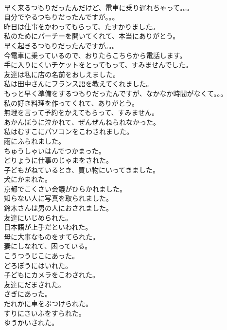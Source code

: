 \documentclass[8pt]{extreport}
\begin{document}
\begin{CJK}{UTF8}{min}
\\	早く来るつもりだったんだけど、電車に乗り遅れちゃって。。。
\\	自分でやるつもりだったんですが。。。
\\	昨日は仕事をかわってもらって、たすかりました。
\\	私のためにパーチーを開いてくれて、本当にありがとう。
\\	早く起きるつもりだったんですが。。。
\\	今電車に乗っているので、おりたらこちらから電話します。
\\	手に入りにくいチケットをとってもって、すみませんでした。
\\	友達は私に店の名前をおしえました。
\\	私は田中さんにフランス語を教えてくれました。
\\	もっと早く準備をするつもりだったんですが、なかなか時間がなくて。。。
\\	私の好き料理を作ってくれて、ありがとう。
\\	無理を言って予約をかえてもらって、すみません。
\\	あかんぼうに泣かれて、ぜんぜんねられなかった。
\\	私はむすこにパソコンをこわされました。
\\	雨にふられました。
\\	ちゅうしゃいはんでつかまった。
\\	どりょうに仕事のじゃまをされた。
\\	子どもがねているとき、買い物にいってきました。
\\	犬にかまれた。
\\	京都でこくさい会議がひらかれました。
\\	知らない人に写真を取られました。
\\	鈴木さんは男の人におされました。
\\	友達にいじめられた。
\\	日本語が上手だといわれた。
\\	母に大事なものをすてられた。
\\	妻にしなれて、困っている。
\\	こうつうじこにあった。
\\	どろぼうにはいれた。
\\	子どもにカメラをこわされた。
\\	友達にだまされた。
\\	さぎにあった。
\\	だれかに車をぶつけられた。
\\	すりにさいふをすられた。
\\	ゆうかいされた。

\end{CJK}
\end{document}
